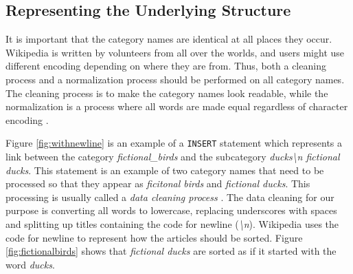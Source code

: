 \subsection{Representing the Underlying Structure}
It is important that the category names are identical at all places they occur. Wikipedia is written by volunteers from all over the worlds, and users might use different encoding depending on where they are from. Thus, both a cleaning process and a normalization process should be performed on all category names. The cleaning process is to make the category names look readable, while the normalization is a process where all words are made equal regardless of character encoding \cite[p.~26]{iirbook}.

Figure \ref{fig:withnewline} is an example of a \texttt{INSERT} statement which represents a link between the category \emph{fictional\_birds} and the subcategory \emph{ducks\textbackslash n fictional ducks}. This statement is an example of two category names that need to be processed so that they appear as \emph{ficitonal birds} and \emph{fictional ducks}. This processing  is usually called a \emph{data cleaning process} \cite{datacleaning}. The data cleaning for our purpose is converting all words to lowercase, replacing underscores with spaces and splitting up titles containing the code for newline (\emph{\textbackslash n}). Wikipedia uses the code for newline to represent how the articles should be sorted. Figure \ref{fig:fictionalbirds} shows that \emph{fictional ducks} are sorted as if it started with the word \emph{ducks}.



